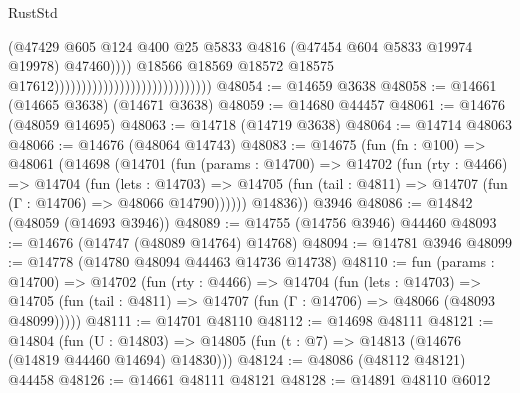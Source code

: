 \begin{lexlean}{RustStd}
\begin{coremodule}
                                                                    (@47429
                                                                      @605
                                                                      @124
                                                                      @400
                                                                      @25
                                                                      @5833
                                                                      @4816
                                                                      (@47454
                                                                        @604
                                                                        @5833
                                                                        @19974
                                                                        @19978)
                                                                      @47460))))
                                                              @18566
                                                              @18569
                                                              @18572
                                                              @18575
                                                              @17612)))))))))))))))))))))))))))))
@48054 := @14659 @3638
@48058 := @14661 (@14665 @3638) (@14671 @3638)
@48059 := @14680 @44457
@48061 := @14676 (@48059 @14695)
@48063 := @14718 (@14719 @3638)
@48064 := @14714 @48063
@48066 := @14676 (@48064 @14743)
@48083 := @14675
    (fun (fn : @100) =>
    @48061
      (@14698
        (@14701
          (fun (params : @14700) =>
          @14702
            (fun (rty : @4466) =>
            @14704
              (fun (lets : @14703) =>
              @14705 (fun (tail : @4811) => @14707 (fun (Γ : @14706) => @48066 @14790))))))
        @14836))
    @3946
@48086 := @14842 (@48059 (@14693 @3946))
@48089 := @14755 (@14756 @3946) @44460
@48093 := @14676 (@14747 (@48089 @14764) @14768)
@48094 := @14781 @3946
@48099 := @14778 (@14780 @48094 @44463 @14736 @14738)
@48110 := fun (params : @14700) =>
  @14702
    (fun (rty : @4466) =>
    @14704
      (fun (lets : @14703) =>
      @14705 (fun (tail : @4811) => @14707 (fun (Γ : @14706) => @48066 (@48093 @48099)))))
@48111 := @14701 @48110
@48112 := @14698 @48111
@48121 := @14804
    (fun (U : @14803) => @14805 (fun (t : @7) => @14813 (@14676 (@14819 @44460 @14694) @14830)))
@48124 := @48086 (@48112 @48121) @44458
@48126 := @14661 @48111 @48121
@48128 := @14891 @48110 @6012

\end{coremodule}
\end{lexlean}
